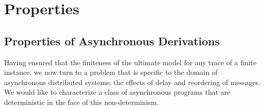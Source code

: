\section{Properties}



\subsection{Properties of Asynchronous Derivations}

Having ensured that the finiteness of the ultimate model for any trace of a
finite \lang instance, we now turn to a problem that is specific to the domain
of asynchronous distributed systems: the effects of delay
and reordering of messages. We would like to characterize a class of
asynchronous \lang programs that are deterministic in the face of this
non-determinism.

%


